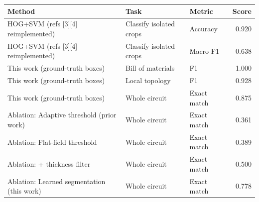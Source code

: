 \begin{tabular}{lllr}
\toprule
Method & Task & Metric & Score \\
\midrule
HOG+SVM (refs [3][4] reimplemented) & Classify isolated crops & Accuracy & 0.920 \\
HOG+SVM (refs [3][4] reimplemented) & Classify isolated crops & Macro F1 & 0.638 \\
This work (ground-truth boxes) & Bill of materials & F1 & 1.000 \\
This work (ground-truth boxes) & Local topology & F1 & 0.928 \\
This work (ground-truth boxes) & Whole circuit & Exact match & 0.875 \\
Ablation: Adaptive threshold (prior work) & Whole circuit & Exact match & 0.361 \\
Ablation: Flat-field threshold & Whole circuit & Exact match & 0.389 \\
Ablation: + thickness filter & Whole circuit & Exact match & 0.500 \\
Ablation: Learned segmentation (this work) & Whole circuit & Exact match & 0.778 \\
\bottomrule
\end{tabular}
